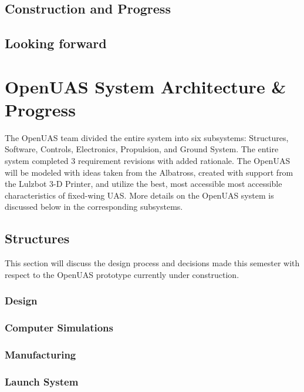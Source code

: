 \documentclass{article}
\begin{document}
\subsection{Construction and Progress}

 
\subsection{Looking forward}



\section{OpenUAS System Architecture \& Progress}
\noindent The OpenUAS team divided the entire system into six subsystems: Structures, Software, Controls, Electronics, Propulsion, and Ground System. The entire system completed 3 requirement revisions with added rationale. The OpenUAS will be modeled with ideas taken from the Albatross, created with support from the Lulzbot 3-D Printer, and utilize the best, most accessible most accessible characteristics of fixed-wing UAS. More details on the OpenUAS system is discussed below in the corresponding subsystems. \\

\subsection{Structures}
This section will discuss the design process and decisions made this semester with respect to the OpenUAS prototype currently under construction.

\subsubsection{Design}

\subsubsection{Computer Simulations}

\subsubsection{Manufacturing}

\subsubsection{Launch System}
\end{document}
